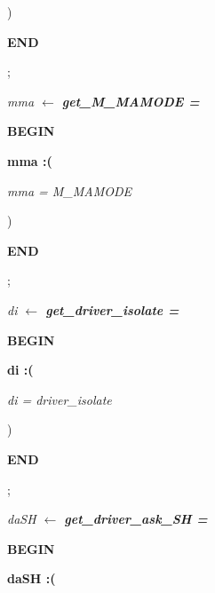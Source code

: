 \documentclass[11pt]{article}
\begin{document}
\begin{sloppypar}
\hspace*{0.60in}\rm )

\hspace*{0.20in}\bf END

\hspace*{0.20in}\rm ;

\hspace*{0.20in}

\hspace*{0.20in}\it mma  $\leftarrow$  \bf get\_M\_MAMODE \rm = 

\hspace*{0.20in}\bf BEGIN

\hspace*{0.40in}\bf mma \rm :\rm (

\hspace*{0.60in}\it mma \rm = \it M\_MAMODE

\hspace*{0.60in}\rm )

\hspace*{0.20in}\bf END

\vspace*{4mm}
\hspace*{0.20in}\rm ;

\hspace*{0.20in}

\hspace*{0.20in}\it di  $\leftarrow$  \bf get\_driver\_isolate \rm = 

\hspace*{0.20in}\bf BEGIN

\hspace*{0.40in}\bf di \rm :\rm (

\hspace*{0.60in}\it di \rm = \it driver\_isolate

\hspace*{0.60in}\rm )

\hspace*{0.20in}\bf END

\hspace*{0.40in}\rm ;

\hspace*{0.20in}

\hspace*{0.20in}\it daSH  $\leftarrow$  \bf get\_driver\_ask\_SH \rm = 

\hspace*{0.20in}\bf BEGIN

\hspace*{0.40in}\bf daSH \rm :\rm (


\end{sloppypar}
\end{document}
